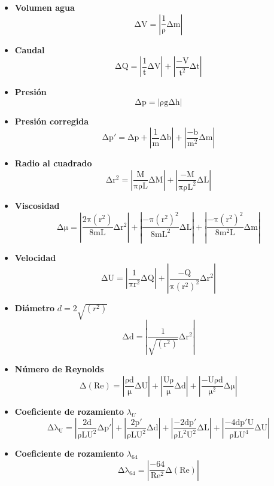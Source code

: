 \begin{itemize}

\item\textbf{Volumen agua}
\[\mathrm{\Delta V = \left\vert \frac{1}{\rho} \Delta m\right\vert }\]


\item \textbf{Caudal}
\[\mathrm{\Delta Q = \left\vert  \frac{1}{t}  \Delta V\right\vert + \left\vert  \frac{-V}{t^{2}}  \Delta t\right\vert }\]

\item \textbf{Presión}
\[\mathrm{\Delta p = \left\vert \rho g  \Delta h \right\vert }\]

\item \textbf{Presión corregida}
\[\mathrm{\Delta p' = \Delta p + \left\vert \frac{1}{m} \Delta b \right\vert + \left\vert \frac{-b}{m^2} \Delta m \right\vert }\]

\item \textbf{Radio al cuadrado}
\[\mathrm{\Delta r^2 = \left\vert \frac{M}{\pi \rho L} \Delta M \right\vert + \left\vert \frac{-M}{\pi \rho L^2}\Delta L\right\vert }\]

\item \textbf{Viscosidad}
\[\mathrm{\Delta \mu = \left\vert  \frac{2 \pi \left( r^2 \right) }{8mL}  \Delta r^2 \right\vert + \left\vert  \frac{- \pi \left( r^2 \right)^{2}}{8mL^2} \Delta L \right\vert + \left\vert  \frac{- \pi \left( r^2 \right)^{2}}{8m^2L} \Delta m \right\vert }\]

\item \textbf{Velocidad}
\[\mathrm{\Delta U = \left\vert \frac{1}{\pi r^2} \Delta Q \right\vert + \left\vert \frac{-Q}{\pi \left( r^2 \right)^2}  \Delta r^2\right\vert }\]

\item \textbf{Diámetro} $d = 2 \sqrt{\left( r^2 \right)}$
\[\mathrm{\Delta d = \left\vert \frac{1}{\sqrt{\left( r^2 \right)}} \Delta r^2 \right\vert }\]

\item \textbf{Número de Reynolds}
\[\mathrm{\Delta \left( Re \right) = \left\vert \frac{\rho d}{\mu}  \Delta U \right\vert + \left\vert \frac{U\rho}{\mu} \Delta d \right\vert + \left\vert \frac{-U \rho d}{\mu^{2}} \Delta \mu \right\vert  }\]

\item \textbf{Coeficiente de rozamiento} $\lambda_U$
\[\mathrm{\Delta \lambda_U = \left\vert \frac{2d}{\rho L U^{2}} \Delta p' \right\vert + \left\vert \frac{2 p'}{\rho L U^{2}} \Delta d \right\vert + \left\vert \frac{-2d p'}{\rho L^{2} U^{2}} \Delta L \right\vert + \left\vert \frac{-4d p' U}{\rho L U^{4}} \Delta U \right\vert }\]

\item \textbf{Coeficiente de rozamiento} $\lambda_{64}$
\[\mathrm{\Delta \lambda_{64} = \left\vert  \frac{-64}{Re^{2}}  \Delta \left( Re \right) \right\vert  }\]

\end{itemize}